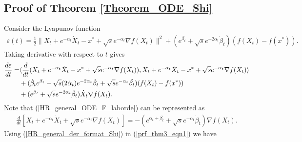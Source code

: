 \documentclass{article}
\theoremstyle{plain}
\theoremstyle{definition}
\theoremstyle{remark}
\begin{document}
\subsection{Proof of Theorem \ref{Theorem_ODE_Shi}}\label{thm3_proof}
Consider the Lyapunov function 
\begin{align}\label{lyap_theorem3}
    \varepsilon(t)=\frac{1}{2}\|X_t+e^{-\alpha_t}\dot X_t-x^*+\sqrt{s}e^{-\alpha_t}\nabla f(X_t)\|^2+(e^{\beta_t}+\sqrt{s}e^{-2\alpha_t}\dot \beta_t)(f(X_t)-f(x^*)).
\end{align}
Taking derivative with respect to $t$ gives
\begin{align}\label{prf_thm3_eqn1}
    \frac{d \varepsilon}{dt}=&\langle \frac{d}{dt}(X_t+e^{-\alpha_t}\dot X_t-x^*+\sqrt{s}e^{-\alpha_t}\nabla f(X_t)),X_t+e^{-\alpha_t}\dot X_t-x^*+\sqrt{s}e^{-\alpha_t}\nabla f(X_t)\rangle\nonumber\\
    & +(\dot \beta_te^{\beta_t}-\sqrt{s}(2\dot \alpha_t)e^{-2\alpha_t}\dot \beta_t +\sqrt{s}e^{-\alpha_t}\Ddot{\beta_t})(f(X_t)-f(x^*))\nonumber\\
    &+(e^{\beta_t}+\sqrt{s}e^{-2\alpha_t}\dot \beta_t)\dot X_t\nabla f(X_t).
\end{align}
Note that (\ref{HR_general_ODE_F_laborde}) can be represented as
\begin{align}\label{HR_general_der_format_Shi}
    \frac{d}{dt}\left[X_t+e^{-\alpha_t}\dot X_t+\sqrt{s}e^{-\alpha_t}\nabla f(X_t)\right]=-\left(e^{\alpha_t+\beta_t}+\sqrt{s}e^{-\alpha_t}\dot \beta_t \right)\nabla f(X_t).
\end{align}
Using (\ref{HR_general_der_format_Shi}) in (\ref{prf_thm3_eqn1}) we have
\end{document}
